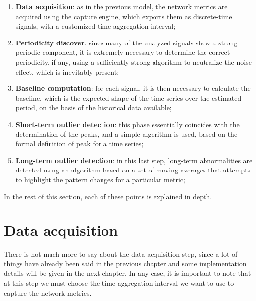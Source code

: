 \documentclass[12pt,a4paper,cucitura]{toptesi}
\begin{document}
\begin{enumerate}
\item \textbf{Data acquisition}: as in the previous model, the network metrics are acquired using the capture engine, which exports them as discrete-time signals, with a customized time aggregation interval;
\item \textbf{Periodicity discover}: since many of the analyzed signals show a strong periodic component, it is extremely necessary to determine the correct periodicity, if any, using a sufficiently strong algorithm to neutralize the noise effect, which is inevitably present;
\item \textbf{Baseline computation}: for each signal, it is then necessary to calculate the baseline, which is the expected shape of the time series over the estimated period, on the basis of the historical data available;
\item \textbf{Short-term outlier detection}: this phase essentially coincides with the determination of the peaks, and a simple algorithm is used, based on the formal definition of peak for a time series;
\item \textbf{Long-term outlier detection}: in this last step, long-term abnormalities are detected using an algorithm based on a set of moving averages that attempts to highlight the pattern changes for a particular metric;
\end{enumerate}

In the rest of this section, each of these points is explained in depth.

\section{Data acquisition}

There is not much more to say about the data acquisition step, since a lot of things have already been said in the previous chapter and some implementation details will be given in the next chapter.
In any case, it is important to note that at this step we must choose the time aggregation interval we want to use to capture the network metrics.
\end{document}
